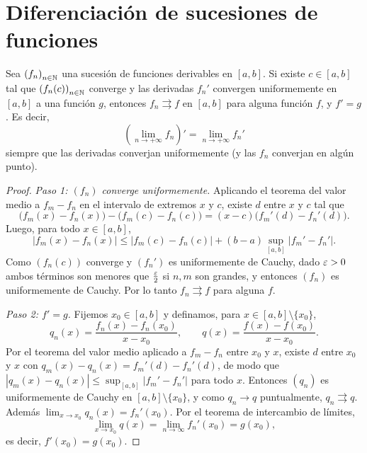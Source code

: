 \section{Diferenciación de sucesiones de funciones}

\begin{theorem}
  Sea \({(f_n)}_{n \in \mathbb{N}}\) una sucesión de funciones derivables en \([a, b]\). Si existe \(c \in [a, b]\) tal que \({(f_n(c))}_{n \in \mathbb{N}}\) converge y las derivadas \(f_n'\) convergen uniformemente en \([a, b]\) a una función \(g\), entonces \(f_n \rightrightarrows f\) en \([a, b]\) para alguna función \(f\), y \(f' = g\). Es decir,
  \[
    {\left( \lim_{n \to +\infty} f_n \right)}' = \lim_{n \to +\infty} f_n'
  \]
  siempre que las derivadas converjan uniformemente (y las \(f_n\) converjan en algún punto).
\end{theorem}

\begin{proof}
  \emph{Paso 1: \({(f_n)}\) converge uniformemente.} Aplicando el teorema del valor medio a \(f_m - f_n\) en el intervalo de extremos \(x\) y \(c\), existe \(d\) entre \(x\) y \(c\) tal que
  \[
    \bigl( f_m(x) - f_n(x) \bigr) - \bigl( f_m(c) - f_n(c) \bigr) = (x - c) \bigl( f_m'(d) - f_n'(d) \bigr).
  \]
  Luego, para todo \(x \in [a, b]\),
  \[
    |f_m(x) - f_n(x)| \leq |f_m(c) - f_n(c)| + (b - a) \sup_{[a, b]} |f_m' - f_n'|.
  \]
  Como \({(f_n(c))}\) converge y \({(f_n')}\) es uniformemente de Cauchy, dado \(\varepsilon > 0\) ambos términos son menores que \(\frac{\varepsilon}{2}\) si \(n, m\) son grandes, y entonces \({(f_n)}\) es uniformemente de Cauchy. Por lo tanto \(f_n \rightrightarrows f\) para alguna \(f\).

  \emph{Paso 2: \(f' = g\).} Fijemos \(x_0 \in [a, b]\) y definamos, para \(x \in [a, b] \setminus \{x_0\}\),
  \[
    q_n(x) = \frac{f_n(x) - f_n(x_0)}{x - x_0}, \qquad q(x) = \frac{f(x) - f(x_0)}{x - x_0}.
  \]
  Por el teorema del valor medio aplicado a \(f_m - f_n\) entre \(x_0\) y \(x\), existe \(d\) entre \(x_0\) y \(x\) con \(q_m(x) - q_n(x) = f_m'(d) - f_n'(d)\), de modo que \(|q_m(x) - q_n(x)| \leq \sup_{[a, b]} |f_m' - f_n'|\) para todo \(x\). Entonces \({(q_n)}\) es uniformemente de Cauchy en \([a, b] \setminus \{x_0\}\), y como \(q_n \to q\) puntualmente, \(q_n \rightrightarrows q\). Además \(\lim_{x \to x_0} q_n(x) = f_n'(x_0)\). Por el teorema de intercambio de límites,
  \[
    \lim_{x \to x_0} q(x) = \lim_{n \to \infty} f_n'(x_0) = g(x_0),
  \]
  es decir, \(f'(x_0) = g(x_0)\).
\end{proof}

